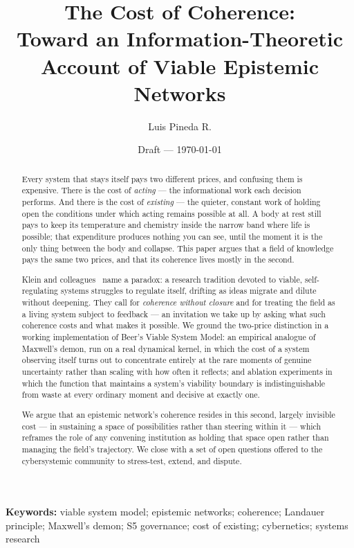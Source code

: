 \documentclass[12pt]{article}
\title{The Cost of Coherence:\\
\large Toward an Information-Theoretic Account of Viable Epistemic Networks}
\author{Luis Pineda R.}
\date{Draft — \today}
\begin{document}
\maketitle

\begin{abstract}
Every system that stays itself pays two different prices, and confusing them is expensive.
There is the cost of \emph{acting} --- the informational work each decision performs. And there
is the cost of \emph{existing} --- the quieter, constant work of holding open the conditions
under which acting remains possible at all. A body at rest still pays to keep its temperature and
chemistry inside the narrow band where life is possible; that expenditure produces nothing you
can see, until the moment it is the only thing between the body and collapse. This paper argues
that a field of knowledge pays the same two prices, and that its coherence lives mostly in the
second.

Klein and colleagues~\citeyearpar{Klein2025} name a paradox: a research tradition devoted to
viable, self-regulating systems struggles to regulate itself, drifting as ideas migrate and
dilute without deepening. They call for \emph{coherence without closure} and for treating the
field as a living system subject to feedback --- an invitation we take up by asking what such
coherence costs and what makes it possible. We ground the two-price distinction in a working
implementation of Beer's Viable System Model: an empirical analogue of Maxwell's demon, run on a
real dynamical kernel, in which the cost of a system observing itself turns out to concentrate
entirely at the rare moments of genuine uncertainty rather than scaling with how often it
reflects; and ablation experiments in which the function that maintains a system's viability
boundary is indistinguishable from waste at every ordinary moment and decisive at exactly one.

We argue that an epistemic network's coherence resides in this second, largely invisible cost ---
in sustaining a space of possibilities rather than steering within it --- which reframes the role
of any convening institution as holding that space open rather than managing the field's
trajectory. We close with a set of open questions offered to the cybersystemic community to
stress-test, extend, and dispute.
\end{abstract}

\textbf{Keywords:} viable system model; epistemic networks; coherence; Landauer principle;
Maxwell's demon; S5 governance; cost of existing; cybernetics; systems research
\end{document}
